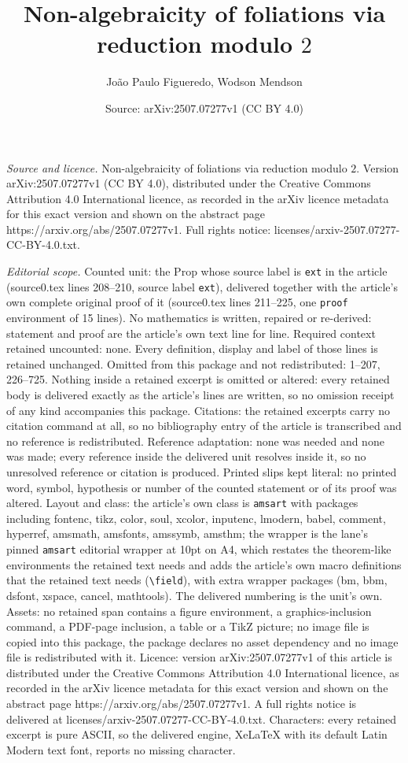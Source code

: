\documentclass[10pt,a4paper]{amsart}
\title[Non-algebraicity of foliations via reduction modulo $2$]{Non-algebraicity of foliations via reduction modulo $2$}
\author{Jo\~ao Paulo Figueredo, Wodson Mendson}
\date{Source: arXiv:2507.07277v1 (CC BY 4.0)}
\begin{document}
\maketitle

\noindent\emph{Source and licence.} Non-algebraicity of foliations via reduction modulo $2$. Version arXiv:2507.07277v1 (CC BY 4.0), distributed under the Creative Commons Attribution 4.0 International licence, as recorded in the arXiv licence metadata for this exact version and shown on the abstract page https://arxiv.org/abs/2507.07277v1. Full rights notice: licenses/arxiv-2507.07277-CC-BY-4.0.txt.\par\smallskip

\noindent\textit{Editorial scope.} Counted unit: the Prop whose source label is \texttt{ext} in the article (source0.tex lines 208--210, source label \texttt{ext}), delivered together with the article's own complete original proof of it (source0.tex lines 211--225, one \texttt{proof} environment of 15 lines). No mathematics is written, repaired or re-derived: statement and proof are the article's own text line for line. Required context retained uncounted: none. Every definition, display and label of those lines is retained unchanged. Omitted from this package and not redistributed: 1--207, 226--725. Nothing inside a retained excerpt is omitted or altered: every retained body is delivered exactly as the article's lines are written, so no omission receipt of any kind accompanies this package. Citations: the retained excerpts carry no citation command at all, so no bibliography entry of the article is transcribed and no reference is redistributed. Reference adaptation: none was needed and none was made; every reference inside the delivered unit resolves inside it, so no unresolved reference or citation is produced. Printed slips kept literal: no printed word, symbol, hypothesis or number of the counted statement or of its proof was altered. Layout and class: the article's own class is \texttt{amsart} with packages including fontenc, tikz, color, soul, xcolor, inputenc, lmodern, babel, comment, hyperref, amsmath, amsfonts, amssymb, amsthm; the wrapper is the lane's pinned \texttt{amsart} editorial wrapper at 10pt on A4, which restates the theorem-like environments the retained text needs and adds the article's own macro definitions that the retained text needs (\texttt{\textbackslash field}), with extra wrapper packages (bm, bbm, dsfont, xspace, cancel, mathtools). The delivered numbering is the unit's own. Assets: no retained span contains a figure environment, a graphics-inclusion command, a PDF-page inclusion, a table or a TikZ picture; no image file is copied into this package, the package declares no asset dependency and no image file is redistributed with it. Licence: version arXiv:2507.07277v1 of this article is distributed under the Creative Commons Attribution 4.0 International licence, as recorded in the arXiv licence metadata for this exact version and shown on the abstract page https://arxiv.org/abs/2507.07277v1. A full rights notice is delivered at licenses/arxiv-2507.07277-CC-BY-4.0.txt. Characters: every retained excerpt is pure ASCII, so the delivered engine, XeLaTeX with its default Latin Modern text font, reports no missing character.
\end{document}
